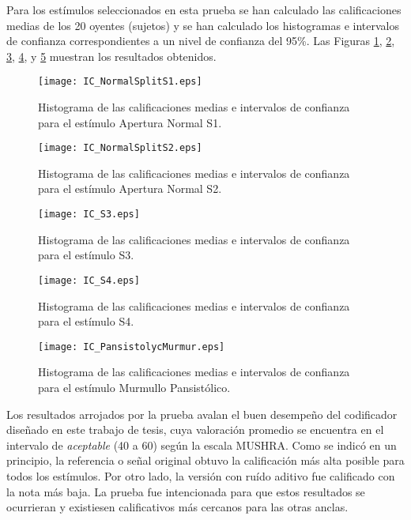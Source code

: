 Para los estímulos seleccionados en esta prueba se han calculado las calificaciones medias de los 20 oyentes (sujetos) y se han calculado los histogramas e intervalos de confianza correspondientes a un nivel de confianza del 95\%. Las Figuras \ref{IC_NS1}, \ref{IC_NS2}, \ref{IC_S3}, \ref{IC_S4}, y \ref{IC_PM} muestran los resultados obtenidos.

\begin{figure}[h!]
  \centering
  \texttt{[image: IC\_NormalSplitS1.eps]}
  \caption{Histograma de las calificaciones medias e intervalos de confianza para el estímulo Apertura Normal S1.}
  \label{IC_NS1}
\end{figure}
\begin{figure}[h!]
  \centering
  \texttt{[image: IC\_NormalSplitS2.eps]}
  \caption{Histograma de las calificaciones medias e intervalos de confianza para el estímulo Apertura Normal S2.}
  \label{IC_NS2}
\end{figure}
\begin{figure}[h!]
  \centering
  \texttt{[image: IC\_S3.eps]}
  \caption{Histograma de las calificaciones medias e intervalos de confianza para el estímulo S3.}
  \label{IC_S3}
\end{figure}

\begin{figure}[h!]
  \centering
  \texttt{[image: IC\_S4.eps]}
  \caption{Histograma de las calificaciones medias e intervalos de confianza para el estímulo S4.}
  \label{IC_S4}
\end{figure}
\begin{figure}[h!]
  \centering
  \texttt{[image: IC\_PansistolycMurmur.eps]}
  \caption{Histograma de las calificaciones medias e intervalos de confianza para el estímulo Murmullo Pansistólico.}
  \label{IC_PM}
\end{figure}

 Los resultados arrojados por la prueba avalan el buen desempeño del codificador diseñado en este trabajo de tesis, cuya valoración promedio se encuentra en el intervalo de \emph{aceptable} (40 a 60) según la escala MUSHRA. Como se indicó en un principio, la referencia o señal original obtuvo la calificación más alta posible para todos los estímulos. Por otro lado, la versión con ruído aditivo fue calificado con la nota más baja. La prueba fue intencionada para que estos resultados se ocurrieran y existiesen calificativos más cercanos para las otras anclas. 

